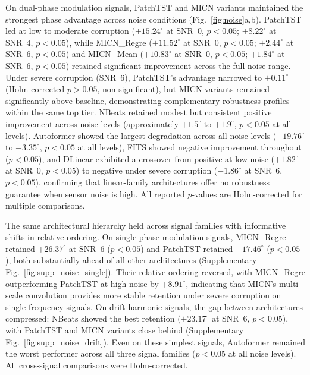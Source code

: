 On dual-phase modulation signals, PatchTST and MICN variants maintained the strongest phase advantage across noise conditions (Fig.~\ref{fig:noise}a,b). PatchTST led at low to moderate corruption ($+15.24^{\circ}$ at SNR~0, $p < 0.05$; $+8.22^{\circ}$ at SNR~4, $p < 0.05$), while MICN\_Regre ($+11.52^{\circ}$ at SNR~0, $p < 0.05$; $+2.44^{\circ}$ at SNR~6, $p < 0.05$) and MICN\_Mean ($+10.83^{\circ}$ at SNR~0, $p < 0.05$; $+1.84^{\circ}$ at SNR~6, $p < 0.05$) retained significant improvement across the full noise range. Under severe corruption (SNR~6), PatchTST's advantage narrowed to $+0.11^{\circ}$ (Holm-corrected $p > 0.05$, non-significant), but MICN variants remained significantly above baseline, demonstrating complementary robustness profiles within the same top tier. NBeats \cite{oreshkin2019n} retained modest but consistent positive improvement across noise levels (approximately $+1.5^{\circ}$ to $+1.9^{\circ}$, $p < 0.05$ at all levels). Autoformer showed the largest degradation across all noise levels ($-19.76^{\circ}$ to $-3.35^{\circ}$, $p < 0.05$ at all levels), FITS showed negative improvement throughout ($p < 0.05$), and DLinear exhibited a crossover from positive at low noise ($+1.82^{\circ}$ at SNR~0, $p < 0.05$) to negative under severe corruption ($-1.86^{\circ}$ at SNR~6, $p < 0.05$), confirming that linear-family architectures offer no robustness guarantee when sensor noise is high. All reported $p$-values are Holm-corrected for multiple comparisons.

The same architectural hierarchy held across signal families with informative shifts in relative ordering. On single-phase modulation signals, MICN\_Regre retained $+26.37^{\circ}$ at SNR~6 ($p < 0.05$) and PatchTST retained $+17.46^{\circ}$ ($p < 0.05$), both substantially ahead of all other architectures (Supplementary Fig.~\ref{fig:supp_noise_single}). Their relative ordering reversed, with MICN\_Regre outperforming PatchTST at high noise by $+8.91^{\circ}$, indicating that MICN's multi-scale convolution provides more stable retention under severe corruption on single-frequency signals. On drift-harmonic signals, the gap between architectures compressed: NBeats showed the best retention ($+23.17^{\circ}$ at SNR~6, $p < 0.05$), with PatchTST and MICN variants close behind (Supplementary Fig.~\ref{fig:supp_noise_drift}). Even on these simplest signals, Autoformer remained the worst performer across all three signal families ($p < 0.05$ at all noise levels). All cross-signal comparisons were Holm-corrected.


